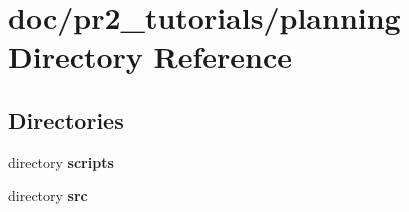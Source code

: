 \section{doc/pr2\-\_\-tutorials/planning Directory Reference}
\label{dir_2af54dc41b21711a08ff5defba921d88}
\subsection*{Directories}
\begin{DoxyCompactItemize}
\item 
directory {\bf scripts}
\item 
directory {\bf src}
\end{DoxyCompactItemize}
